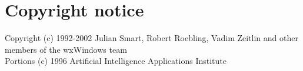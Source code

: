 \begin{comment}
\winhelponly{
\chapter{wxWindows class library reference}\label{winhelpcontents}

\centerline{
}%

\sethotspotcolour{off}%
\sethotspotunderline{on}%
\large{
\image{}{cpp.bmp} \helpref{Alphabetical class reference}{classref}

\image{}{shelves.bmp} \helpref{Classes by category}{classesbycat}

\image{}{book1.bmp} \helpref{Topic overviews}{overviews}

\image{}{hand1.bmp} \helpref{Guide to wxWindows}{wxwinchapters}
}
\sethotspotcolour{on}%
\sethotspotunderline{on}%

\chapter*{Overview of wxWindows}\label{wxwinchapters}

\helpref{Introduction}{introduction}\\
\helpref{The wxWindows resource system}{resourceformats}\\
\helpref{Utilities}{utilities}\\
\helpref{Programming strategies}{strategies}\\
\helpref{Bugs and future directions}{bugs}\\
\helpref{References}{bibliography}
}
\end{comment}

\chapter{Copyright notice}
%
\setfooter{\thepage}{}{}{}{}{\thepage}%

\begin{center}
Copyright (c) 1992-2002 Julian Smart, Robert Roebling, Vadim Zeitlin and other
members of the wxWindows team\\
Portions (c) 1996 Artificial Intelligence Applications Institute\\
\end{center}

